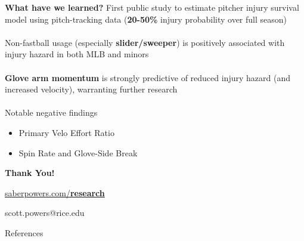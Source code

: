 \documentclass{beamer}
\begin{document}
  \begin{frame}{\bf What have we learned?}
    First public study to estimate pitcher injury survival model using pitch-tracking data (\alert{\bf 20-50\%} injury probability over full season)\\
    ~\\
    Non-fastball usage (especially \alert{\bf slider/sweeper}) is positively associated with injury hazard in both MLB and minors\\
    ~\\
    \alert{\bf Glove arm momentum} is strongly predictive of reduced injury hazard (and increased velocity), warranting further research\\
    ~\\
    Notable negative findings
    \begin{itemize}
      \item Primary Velo Effort Ratio
      \item Spin Rate and Glove-Side Break
    \end{itemize}
  \end{frame}

  \begin{frame}{\bf Thank You!}
    \begin{center}
      \href{https://saberpowers.com/research}{saberpowers.com/\alert{\bf research}}
    \end{center}
    \vfill
    \begin{center}
      scott.powers@rice.edu
    \end{center}
  \end{frame}

  \begin{frame}[noframenumbering]{References}
    \scriptsize
    \printbibliography[heading=none]
  \end{frame}
\end{document}
